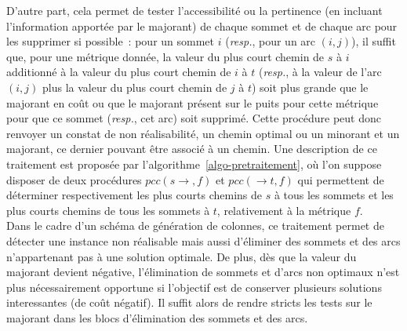 \documentclass[10pt,francais]{llncs}
\begin{document}
D'autre part, cela permet de tester l'accessibilit\'e ou la pertinence (en incluant l'information apport\'ee par le majorant) de chaque sommet et de chaque arc pour les supprimer si possible~: pour un sommet $i$ ({\em resp.}, pour un arc $(i,j)$), il suffit que, pour une m\'etrique donn\'ee, la valeur du plus court chemin de $s$ \`a $i$ additionn\'e \`a la valeur du plus court chemin de $i$ \`a $t$ ({\em resp.}, \`a la valeur de l'arc $(i,j)$ plus la valeur du plus court chemin de $j$ \`a $t$) soit plus grande que le majorant en co\^ut ou que le majorant pr\'esent sur le puits pour cette m\'etrique pour que ce sommet ({\em resp.}, cet arc) soit supprim\'e.
Cette proc\'edure peut donc renvoyer un constat de non r\'ealisabilit\'e, un chemin optimal ou un minorant et un majorant, ce dernier pouvant \^etre associ\'e \`a un chemin. Une description de ce traitement est propos\'ee par l'algorithme~\ref{algo-pretraitement}, o\`u l'on suppose disposer de deux proc\'edures $pcc(s\to,f)$ et  $pcc(\to t,f)$ qui permettent de d\'eterminer respectivement les plus courts chemins de $s$ \`a tous les sommets et les plus courts chemins de tous les sommets \`a $t$, relativement \`a la m\'etrique $f$.\\

Dans le cadre d'un sch\'ema de g\'en\'eration de colonnes, ce traitement permet de d\'etecter une instance non r\'ealisable mais aussi d'\'eliminer des sommets et des arcs n'appartenant pas \`a une solution optimale. De plus, d\`es que la valeur du majorant devient n\'egative, l'\'elimination de sommets et d'arcs non optimaux n'est plus n\'ecessairement opportune si l'objectif est de conserver plusieurs solutions interessantes (de co\^ut n\'egatif). Il suffit alors de rendre stricts les tests sur le majorant dans les blocs d'\'elimination des sommets et des arcs. 
\end{document}
